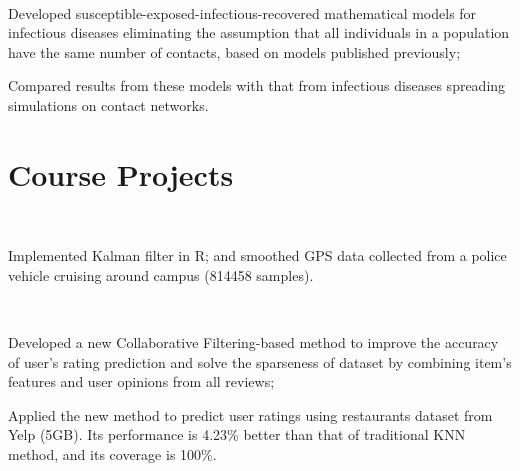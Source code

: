 \documentclass[]{deedy-resume-openfont}
\begin{document}
\begin{minipage}[t]{0.66\textwidth}
 \\
\begin{tightemize}
\item Developed susceptible-exposed-infectious-recovered mathematical models for
infectious diseases eliminating the assumption that all individuals in a
population have the same number of contacts, based on models published
previously;
\item Compared results from these models with that from infectious diseases spreading
  simulations on contact networks.
\end{tightemize}
\sectionsep


\section{Course Projects}
 \\
\begin{tightemize}
\item Implemented Kalman filter in R; and smoothed GPS data collected from a
  police vehicle cruising around campus (814458 samples).
\end{tightemize}
\sectionsep

 \\
\begin{tightemize}
\item Developed a new Collaborative Filtering-based method to improve the
  accuracy of user's rating prediction and solve the sparseness of dataset by
  combining item's features and user opinions from all reviews;
\item Applied the new method to predict user ratings using restaurants dataset
  from Yelp (5GB). Its performance is 4.23\% better than that of traditional KNN
  method, and its coverage is 100\%.
\end{tightemize}
\sectionsep


\end{minipage}
\end{document}
